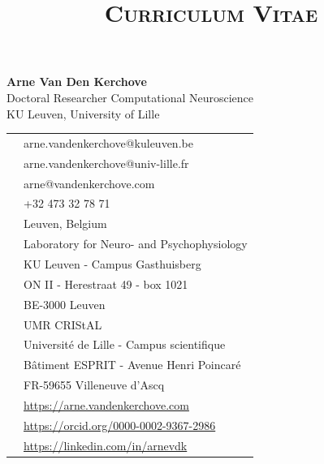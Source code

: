 \documentclass[10pt,a4paper]{article}
\title{\textsc{Curriculum Vitae}}
\date{}
\begin{document}
\maketitle
\begin{minipage}[b]{.7\linewidth}
	\Large \textbf{Arne Van Den Kerchove}\\
	\normalsize Doctoral Researcher Computational Neuroscience\\
	KU Leuven, University of Lille

	\bigskip

	\begin{tabular}{@{}c l}
		\faAt        & arne.vandenkerchove@kuleuven.be             \\
		\faAt        & arne.vandenkerchove@univ-lille.fr           \\
		\faAt        & arne@vandenkerchove.com                     \\
		\faPhone     & +32 473 32 78 71                            \\
		\faMapMarker & Leuven, Belgium                             \\
		\faMapMarker & Laboratory for Neuro- and Psychophysiology  \\
		             & KU Leuven - Campus Gasthuisberg             \\
		             & ON II - Herestraat 49 - box 1021            \\
		             & BE-3000 Leuven                              \\
		\faMapMarker & UMR CRIStAL                                 \\
		             & Université de Lille - Campus scientifique   \\
		             & Bâtiment ESPRIT - Avenue Henri Poincaré     \\
		             & FR-59655 Villeneuve d'Ascq                  \\
		\faGlobe     & \url{https://arne.vandenkerchove.com}       \\
		\aiOrcid     & \url{https://orcid.org/0000-0002-9367-2986} \\
		\faLinkedin  & \url{https://linkedin.com/in/arnevdk}
	\end{tabular}
\end{minipage}%
\end{document}
